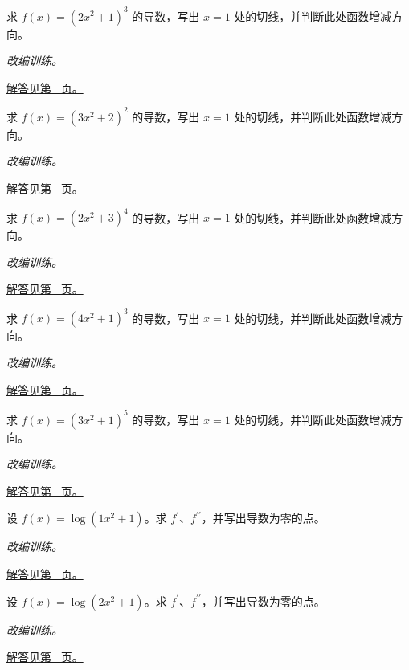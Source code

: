 \documentclass[UTF8,12pt,a4paper,fontset=fandol]{ctexart}
\begin{document}
\begin{example}[幂函数的链式法则]\label{ex:c8q8}
求 $f(x)=(2x^2+1)^{3}$ 的导数，写出 $x=1$ 处的切线，并判断此处函数增减方向。
\par\textit{改编训练。}\par\hyperref[ans:c8q8]{解答见第~\pageref{ans:c8q8} 页。}
\end{example}
\begin{example}[幂函数的链式法则]\label{ex:c8q9}
求 $f(x)=(3x^2+2)^{2}$ 的导数，写出 $x=1$ 处的切线，并判断此处函数增减方向。
\par\textit{改编训练。}\par\hyperref[ans:c8q9]{解答见第~\pageref{ans:c8q9} 页。}
\end{example}
\begin{example}[幂函数的链式法则]\label{ex:c8q10}
求 $f(x)=(2x^2+3)^{4}$ 的导数，写出 $x=1$ 处的切线，并判断此处函数增减方向。
\par\textit{改编训练。}\par\hyperref[ans:c8q10]{解答见第~\pageref{ans:c8q10} 页。}
\end{example}
\begin{example}[幂函数的链式法则]\label{ex:c8q11}
求 $f(x)=(4x^2+1)^{3}$ 的导数，写出 $x=1$ 处的切线，并判断此处函数增减方向。
\par\textit{改编训练。}\par\hyperref[ans:c8q11]{解答见第~\pageref{ans:c8q11} 页。}
\end{example}
\begin{example}[幂函数的链式法则]\label{ex:c8q12}
求 $f(x)=(3x^2+1)^{5}$ 的导数，写出 $x=1$ 处的切线，并判断此处函数增减方向。
\par\textit{改编训练。}\par\hyperref[ans:c8q12]{解答见第~\pageref{ans:c8q12} 页。}
\end{example}
\begin{example}[对数复合与二阶导数]\label{ex:c8q13}
设 $f(x)=\log(1x^2+1)$。求 $f^{\prime}$、$f^{\prime\prime}$，并写出导数为零的点。
\par\textit{改编训练。}\par\hyperref[ans:c8q13]{解答见第~\pageref{ans:c8q13} 页。}
\end{example}
\begin{example}[对数复合与二阶导数]\label{ex:c8q14}
设 $f(x)=\log(2x^2+1)$。求 $f^{\prime}$、$f^{\prime\prime}$，并写出导数为零的点。
\par\textit{改编训练。}\par\hyperref[ans:c8q14]{解答见第~\pageref{ans:c8q14} 页。}
\end{example}
\end{document}

